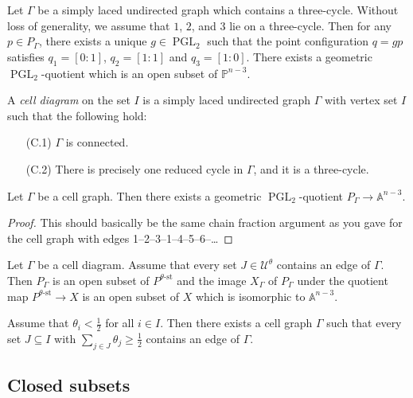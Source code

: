 \documentclass[11pt, a4paper]{amsart}
\begin{document}
	\begin{rem}
		Let \(\Gamma\) be a simply laced undirected graph which contains a three-cycle. 
		Without loss of generality, we assume that \(1\), \(2\), and \(3\) lie on a three-cycle. 
		Then for any \(p \in P_\Gamma\), there exists a unique \(g \in \operatorname{PGL}_2\) such that the point configuration \(q = gp\) satisfies \(q_1 = [0:1]\), \(q_2 = [1:1]\) and \(q_3 = [1:0]\). 
		There exists a geometric \(\operatorname{PGL}_2\)-quotient which is an open subset of \(\mathbb{P}^{n-3}\).
	\end{rem}

	\begin{defn}
		A \emph{cell diagram} on the set \(I\) is a simply laced undirected graph \(\Gamma\) with vertex set \(I\) such that the following hold:
		\begin{enumerate}
			\item[(C.1)] \(\Gamma\) is connected.
			\item[(C.2)] There is precisely one reduced cycle in \(\Gamma\), and it is a three-cycle. 
		\end{enumerate}
	\end{defn}

	\begin{lem}
		Let \(\Gamma\) be a cell graph. 
		Then there exists a geometric \(\operatorname{PGL}_2\)-quotient \(P_{\Gamma} \to \mathbb{A}^{n-3}\).
	\end{lem}

	\begin{proof}
		This should basically be the same chain fraction argument as you gave for the cell graph with edges 1--2--3--1--4--5--6--\ldots
	\end{proof}

	Let \(\Gamma\) be a cell diagram. 
	Assume that every set \(J \in \mathcal{U}^\theta\) contains an edge of \(\Gamma\). 
	Then \(P_\Gamma\) is an open subset of \(P^{\theta\text{-st}}\) and the image \(X_\Gamma\) of \(P_\Gamma\) under the quotient map \(P^{\theta\text{-st}} \to X\) is an open subset of \(X\) which is isomorphic to \(\mathbb{A}^{n-3}\).

	\begin{claim}
		Assume that \(\theta_i < \frac{1}{2}\) for all \(i \in I\). 
		Then there exists a cell graph \(\Gamma\) such that every set \(J \subseteq I\) with \(\sum_{j \in J} \theta_j \geq \frac{1}{2}\) contains an edge of \(\Gamma\).
	\end{claim}

	\subsection*{Closed subsets}
\end{document}
